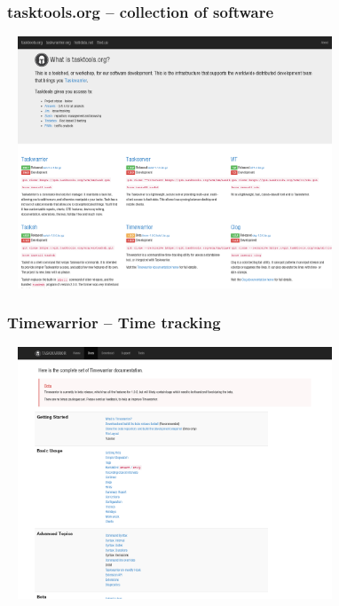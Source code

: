 \documentclass[t,handout]{beamer}
\begin{document}
\begin{frame}\frametitle{tasktools.org -- collection of software}
    \begin{center}
        \href{http://tasktools.org/}{\includegraphics[width=10cm,height=7.5cm]{tasktools-org.png}}
    \end{center}
\end{frame}

\begin{frame}\frametitle{Timewarrior -- Time tracking}
    \begin{center}
        \href{http://taskwarrior.org/docs/timewarrior/index.html}{\includegraphics[width=10cm,height=7.5cm]{timewarrior.png}}
    \end{center}
\end{frame}
\end{document}
